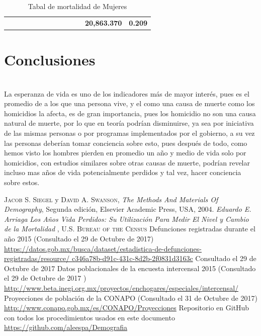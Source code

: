 \documentclass[fontsize=11pt]{article}
\begin{document}
\begin{landscape}
\begin{table}[]
\begin{tabular}{lrrrrrrrrrr|r|r|}
\multicolumn{1}{r}{}    &                            &                            &                            &                              &                             &                                  &                                    &                             &                            &                        & \multicolumn{1}{c|}{\textbf{20,863.370}} & \multicolumn{1}{c|}{\textbf{0.209}} \\ \cline{12-13} 
\end{tabular}
\caption{Tabal de mortalidad de Mujeres}
\label{my-label}
\end{table}
\end{landscape}

\section*{Conclusiones}
\\
La esperanza de vida es uno de los indicadores más de mayor interés, pues es el promedio de a los que una persona vive, y el como una causa de muerte como los homicidios la afecta, es de gran importancia, pues los homicidio no son una causa natural de muerte, por lo que en teoría podrían disminuirse, ya sea por iniciativa de las mismas personas o por programas implementados por el gobierno, a su vez las personas deberían tomar conciencia sobre esto, pues después de todo, como hemos visto los hombres pierden en promedio un año y medio de vida solo por homicidios, con estudios similares sobre otras causas de muerte, podrían revelar incluso mas años de vida potencialmente perdidos y tal vez, hacer conciencia sobre estos.

\begin{thebibliography}{X}
	 \textsc{Jacob S. Siegel} y \textsc{David A. Swanson}, \textit{The Methods And
	Materials Of Demography}, Segunda edición,
	Elsevier Academic Press, USA, 2004.
	 \textit{Eduardo E. Arriaga}\textit{ Los Años Vida Perdidos: Su Utilización Para 		Medir El Nivel y Cambio de la Mortalidad} , \textsc{U.S. Bureau of the Census} 
	 Defunciones registradas durante el año 2015 (Consultado el 29 de Octubre de 2017)  	\url{https://datos.gob.mx/busca/dataset/estadistica-de-defunciones-registradas/resource/				c346a78b-d91c-431c-8d2b-2f0831d3163c} Consultado el 29 de Octubre de 2017 
	 Datos poblacionales de la encuesta intercensal 2015 (Consultado el 29 de Octubre 		de 2017 ) \url{http://www.beta.inegi.org.mx/proyectos/enchogares/especiales/intercensal/} 
	 Proyecciones de población de la CONAPO (Consultado el 31 de Octubre de 2017) 			\url{http://www.conapo.gob.mx/es/CONAPO/Proyecciones} 
	 Repositorio en GitHub con todos los procedimientos usados en este documento 			\url{https://github.com/aleespa/Demografia}
\end{thebibliography}
\end{document}

